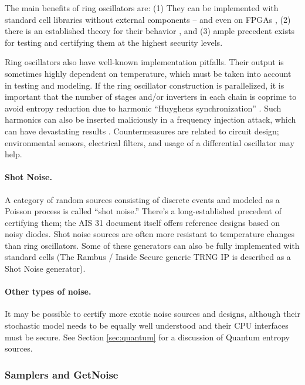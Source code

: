     The main benefits of ring oscillators are: (1) They can be implemented
    with standard cell libraries without external components --
    and even on FPGAs \cite{VaFiAu+10}, (2) there is an established theory
    for their behavior \cite{HaLe98,HaLiLe99,BaLuMi+11}, and (3) ample
    precedent exists for testing and certifying them at the highest security
    levels.

    Ring oscillators also have well-known implementation pitfalls.
    Their output is sometimes highly dependent on temperature,
    which must be taken into account in testing and modeling.
    If the ring oscillator construction is parallelized, it is important
    that the number of stages and/or inverters in each chain is coprime to
    avoid entropy reduction due to harmonic ``Huyghens synchronization''
    \cite{Ba86}.
    Such harmonics can also be inserted maliciously in a frequency
    injection attack, which can have devastating results \cite{MaMo09}.
    Countermeasures are related to circuit design; environmental sensors,
    electrical filters, and usage of a differential oscillator may help.

    \paragraph{Shot Noise.}
    A category of random sources consisting of discrete events
    and modeled as a Poisson process is called ``shot noise.''
    There's a long-established precedent of certifying them; the
    AIS 31 document \cite{KiSc11} itself offers reference designs based on
    noisy diodes. Shot noise sources are often more resistant to
    temperature changes than ring oscillators.
    Some of these generators can also be fully implemented with standard
    cells (The Rambus / Inside Secure generic TRNG IP \cite{Ra20} is
    described as a Shot Noise generator).

    \paragraph{Other types of noise.}
    It may be possible to certify more exotic noise sources and designs,
    although their stochastic model needs to be equally well understood
    and their CPU interfaces must be secure.
    See Section \ref{sec:quantum} for a discussion of Quantum entropy
    sources.


\subsubsection{Samplers and GetNoise}


